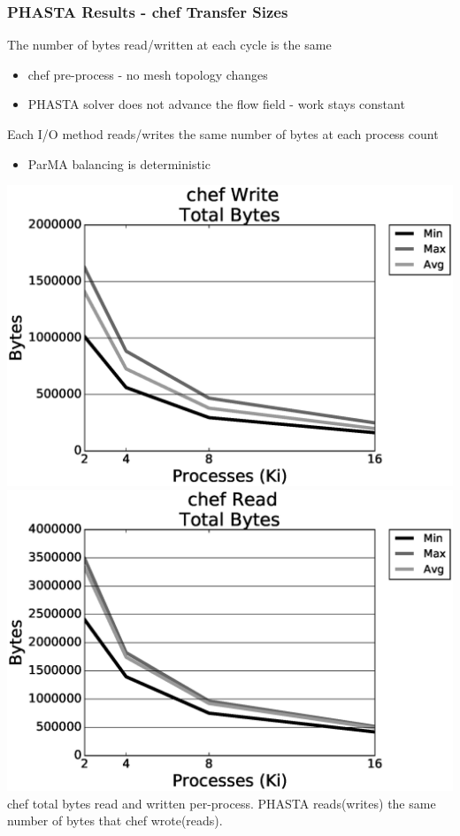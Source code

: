 \documentclass{beamer}
\begin{document}
\begin{frame}
  \frametitle{PHASTA Results - chef Transfer Sizes}
  The number of bytes read/written at each cycle is the same
  \begin{itemize}
    \item chef pre-process - no mesh topology changes
    \item PHASTA solver does not advance the flow field - work stays constant
  \end{itemize}
  Each I/O method reads/writes the same number of bytes at each process count
  \begin{itemize}
    \item ParMA balancing is deterministic
  \end{itemize}
  \centering
  \includegraphics[width=.45\textwidth]{../imp/results/phasta-dambreak/theta/streamchefWriteTotalBytes.eps}
  \includegraphics[width=.45\textwidth]{../imp/results/phasta-dambreak/theta/streamchefReadTotalBytes.eps}\\
  chef total bytes read and written per-process. PHASTA reads(writes) the same number of
  bytes that chef wrote(reads).
\end{frame}
\end{document}
